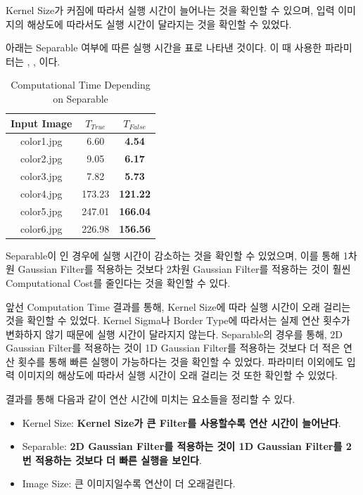 \documentclass{report}
\begin{document}
Kernel Size가 커짐에 따라서 실행 시간이 늘어나는 것을 확인할 수 있으며, 입력 이미지의 해상도에 따라서도 실행 시간이 달라지는 것을 확인할 수 있었다.


아래는 Separable 여부에 따른 실행 시간을 표로 나타낸 것이다. 이 때 사용한 파라미터는 , , 이다.

\begin{table}[h]
    \centering
    \begin{tabular}{@{}ccc@{}}
        \hline
        Input Image & $T_{True}$ & $T_{False}$ \\
        \hline
        color1.jpg & 6.60 & \textbf{4.54} \\
        color2.jpg & 9.05 & \textbf{6.17} \\
        color3.jpg & 7.82 & \textbf{5.73} \\
        color4.jpg & 173.23 & \textbf{121.22} \\
        color5.jpg & 247.01 & \textbf{166.04} \\
        color6.jpg & 226.98 & \textbf{156.56} \\
        \hline
    \end{tabular}
    \caption{Computational Time Depending on Separable}
\end{table}

Separable이 인 경우에 실행 시간이 감소하는 것을 확인할 수 있었으며, 이를 통해 1차원 Gaussian Filter를 적용하는 것보다 2차원 Gaussian Filter를 적용하는 것이 훨씬 Computational Cost를 줄인다는 것을 확인할 수 있다.


앞선 Computation Time 결과를 통해, Kernel Size에 따라 실행 시간이 오래 걸리는 것을 확인할 수 있었다.
Kernel Sigma나 Border Type에 따라서는 실제 연산 횟수가 변화하지 않기 때문에 실행 시간이 달라지지 않는다.
Separable의 경우를 통해, 2D Gaussian Filter를 적용하는 것이 1D Gaussian Filter를 적용하는 것보다 더 적은 연산 횟수를 통해 빠른 실행이 가능하다는 것을 확인할 수 있었다.
파라미터 이외에도 입력 이미지의 해상도에 따라서 실행 시간이 오래 걸리는 것 또한 확인할 수 있었다.

결과를 통해 다음과 같이 연산 시간에 미치는 요소들을 정리할 수 있다.

\begin{itemize}
    \item Kernel Size: \textbf{Kernel Size가 큰 Filter를 사용할수록 연산 시간이 늘어난다}.
    \item Separable: \textbf{2D Gaussian Filter를 적용하는 것이 1D Gaussian Filter를 2번 적용하는 것보다 더 빠른 실행을 보인다}.
    \item Image Size: 큰 이미지일수록 연산이 더 오래걸린다.
\end{itemize}
\end{document}
